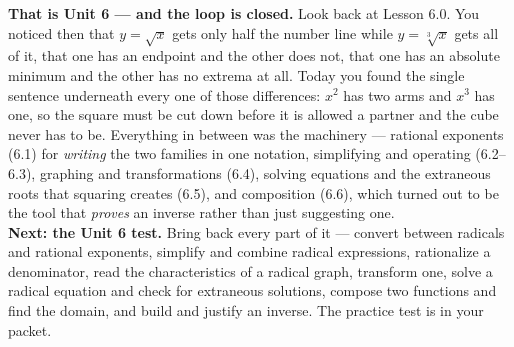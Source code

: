 \documentclass[10pt]{article}
\begin{document}
\begin{spiralbox}
\textbf{That is Unit 6 --- and the loop is closed.} Look back at Lesson 6.0. You noticed then that
$y=\sqrt{x}$ gets only half the number line while $y=\sqrt[3]{x}$ gets all of it, that one has an
endpoint and the other does not, that one has an absolute minimum and the other has no extrema at
all. Today you found the single sentence underneath every one of those differences: $x^{2}$ has two
arms and $x^{3}$ has one, so the square must be cut down before it is allowed a partner and the cube
never has to be. Everything in between was the machinery --- rational exponents (6.1) for
\emph{writing} the two families in one notation, simplifying and operating (6.2--6.3), graphing and
transformations (6.4), solving equations and the extraneous roots that squaring creates (6.5), and
composition (6.6), which turned out to be the tool that \emph{proves} an inverse rather than just
suggesting one.
\\[4pt]
\textbf{Next: the Unit 6 test.} Bring back every part of it --- convert between radicals and rational
exponents, simplify and combine radical expressions, rationalize a denominator, read the
characteristics of a radical graph, transform one, solve a radical equation and check for
extraneous solutions, compose two functions and find the domain, and build and justify an inverse.
The practice test is in your packet.
\end{spiralbox}
\end{document}
